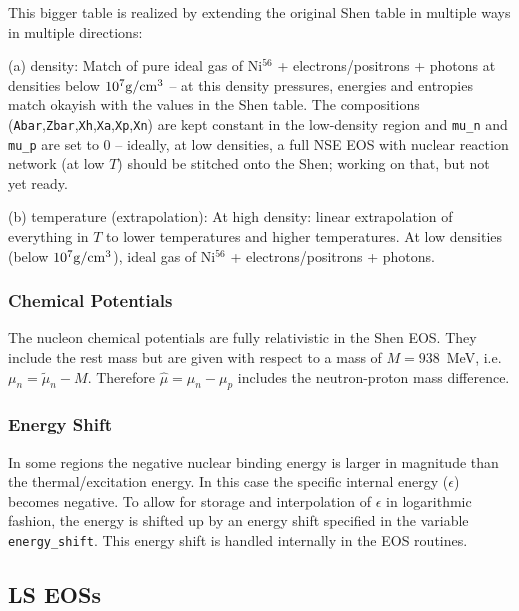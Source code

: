 \documentclass[10pt,nofootinbib]{article}
\newcommand{\code}[1]{\texttt{#1}}
\begin{document}
This bigger table is realized by extending the original Shen table in
multiple ways in multiple directions:\newline
\newline
 
(a) density: \newline Match of pure ideal gas of Ni$^{56}$ +
electrons/positrons + photons at densities below $10^7
\rm{g}/\rm{cm}^3$ -- at this density pressures, energies and entropies
match okayish with the values in the Shen table. The compositions
(\code{Abar},\code{Zbar},\code{Xh},\code{Xa},\code{Xp},\code{Xn}) are
kept constant in the low-density region and \code{mu\_n} and
\code{mu\_p} are set to 0 -- ideally, at low densities, a full NSE EOS
with nuclear reaction network (at low $T$) should be stitched onto the
Shen; working on that, but not yet ready.  \newline \newline

(b) temperature (extrapolation): \newline At high density: linear
extrapolation of everything in $T$ to lower temperatures and higher
temperatures. At low densities (below $10^7 \rm{g}/\rm{cm}^3$), ideal
gas of Ni$^{56}$ + electrons/positrons + photons.

\subsubsection{Chemical Potentials}
The nucleon chemical potentials are fully relativistic in the Shen
EOS.  They include the rest mass but are given with respect to a
mass of $M = 938$~MeV, i.e. $\mu_n = \tilde{\mu}_n - M$.  Therefore
$\hat{\mu} = \mu_n-\mu_p$ includes the neutron-proton mass difference.

\subsubsection{Energy Shift}
In some regions the negative nuclear binding energy is larger in
magnitude than the thermal/excitation energy. In this case the
specific internal energy ($\epsilon$) becomes negative. To allow for storage
and interpolation of $\epsilon$ in logarithmic fashion, the energy is shifted
up by an energy shift specified in the variable \code{energy\_shift}. This
energy shift is handled internally in the EOS routines.

\subsection{LS EOSs}
\end{document}
